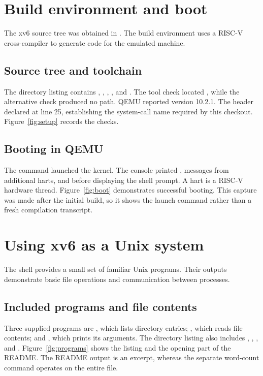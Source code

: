 \documentclass{../latex/utmreport}
\begin{document}
\chapter{Build environment and boot}
The xv6 source tree was obtained in . The build environment
uses a RISC-V cross-compiler to generate code for the emulated machine.

\section{Source tree and toolchain}
The directory listing contains , , ,
, and . The tool check located
, while the alternative
 check produced no path. QEMU reported version
10.2.1. The header  declared 
at line 25, establishing the system-call name required by this checkout.
Figure~\ref{fig:setup} records the checks.

\section{Booting in QEMU}
The command  launched the kernel. The console printed
, messages from additional harts, and
 before displaying the shell prompt.
A hart is a RISC-V hardware thread. Figure~\ref{fig:boot} demonstrates
successful booting. This capture was made after the initial build, so it
shows the launch command rather than a fresh compilation transcript.

\chapter{Using xv6 as a Unix system}
The shell provides a small set of familiar Unix programs. Their outputs
demonstrate basic file operations and communication between processes.

\section{Included programs and file contents}
Three supplied programs are , which lists directory entries;
, which reads file contents; and , which prints its
arguments. The directory listing also includes , ,
, and . Figure~\ref{fig:programs} shows the listing
and the opening part of the README. The README output is an excerpt,
whereas the separate word-count command operates on the entire file.
\end{document}
